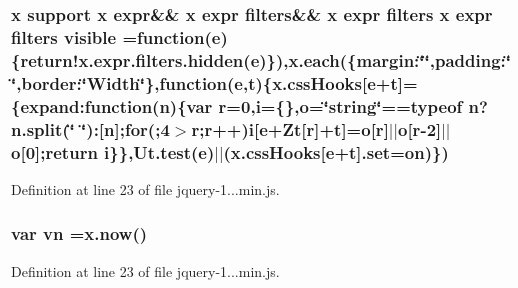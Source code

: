 \subsubsection[{visible}]{ {\bf x} support {\bf x} expr\&\& {\bf x} expr filters\&\& {\bf x} expr filters {\bf x} expr filters visible =function({\bf e})\{{\bf return!x.\+expr.\+filters.\+hidden}({\bf e})\}),{\bf x.\+each}(\{margin\+:\char`\"{}\char`\"{},padding\+:\char`\"{}\char`\"{},border\+:\char`\"{}Width\char`\"{}\},function({\bf e},{\bf t})\{x.\+css\+Hooks\mbox{[}{\bf e}+{\bf t}\mbox{]}=\{expand\+:function(n)\{var r=0,{\bf i}=\{\},{\bf o}=\char`\"{}string\char`\"{}==typeof n?n.\+split(\char`\"{} \char`\"{})\+:\mbox{[}n\mbox{]};for(;4$>$r;r++){\bf i}\mbox{[}{\bf e}+Zt\mbox{[}r\mbox{]}+{\bf t}\mbox{]}={\bf o}\mbox{[}r\mbox{]}$\vert$$\vert${\bf o}\mbox{[}r-\/2\mbox{]}$\vert$$\vert${\bf o}\mbox{[}0\mbox{]};return {\bf i}\}\},Ut.\+test({\bf e})$\vert$$\vert$(x.\+css\+Hooks\mbox{[}{\bf e}+{\bf t}\mbox{]}.set={\bf on})\})}\label{obj_2_release_2_package_2_package_tmp_2_scripts_2jquery-1_810_82_8min_8js_a52992524aa1f4d01d5c9f1b9a15c35f5}


Definition at line 23 of file jquery-\/1...\+min.\+js.

\hypertarget{obj_2_release_2_package_2_package_tmp_2_scripts_2jquery-1_810_82_8min_8js_a4d3ea42bab8c1a36105c29b5a098a050}{}
\subsubsection[{vn}]{\setlength{\rightskip}{0pt plus 5cm}var vn =x.\+now()}\label{obj_2_release_2_package_2_package_tmp_2_scripts_2jquery-1_810_82_8min_8js_a4d3ea42bab8c1a36105c29b5a098a050}


Definition at line 23 of file jquery-\/1...\+min.\+js.

\hypertarget{obj_2_release_2_package_2_package_tmp_2_scripts_2jquery-1_810_82_8min_8js_aaa87ec69cc4d144180280e906cac73f1}{}
